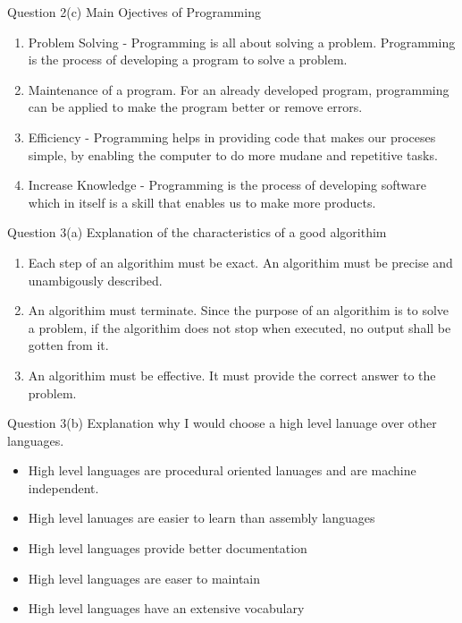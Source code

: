 \documentclass[12pt,legal]{article}
\begin{document}
Question 2(c) Main Ojectives of Programming
\begin{enumerate}
  \item{Problem Solving - Programming is all about solving a problem.
      Programming is the process of developing a program to solve a problem.}
    \item{Maintenance of a program. For an already developed program,
        programming can be applied to make the program better or remove errors.}
      \item{Efficiency - Programming helps in providing code that makes our
          proceses simple, by enabling the computer to do more mudane and
          repetitive tasks.}
        \item{Increase Knowledge - Programming is the process of developing
            software which in itself is a skill that enables us to make more
            products.}
        \end{enumerate}
Question 3(a) Explanation of the characteristics of a good algorithim

\begin{enumerate}
  \item{Each step of an algorithim must be exact. An algorithim must be precise
      and unambigously described.}
    \item{An algorithim must terminate. Since the purpose of an algorithim is to
      solve a problem, if the algorithim does not stop when executed, no output
      shall be gotten from it.}
    \item{An algorithim must be effective. It must provide the correct answer to
      the problem.}  
\end{enumerate}

Question 3(b) Explanation why I would choose a high level lanuage over other
languages.

\begin{itemize}
  \item{High level languages are procedural oriented lanuages and are machine
      independent.}
  \item{High level lanuages are easier to learn than assembly languages}
  \item{High level languages provide better documentation}
  \item{High level languages are easer to maintain}
    \item{High level languages have an extensive vocabulary}
  \end{itemize}
\end{document}
